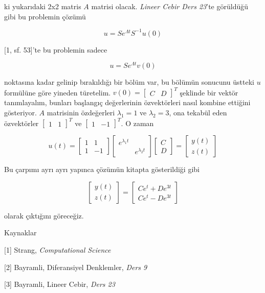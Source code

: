 \documentclass[12pt,fleqn]{article}\usepackage{../../common}
\begin{document}
ki yukarıdaki 2x2 matris $A$ matrisi olacak. {\em Lineer Cebir Ders 23}'te
görüldüğü gibi bu problemin çözümü 

$$ u = S e^{\Lambda t} S^{-1} u(0) $$

[1, sf. 53]'te bu problemin sadece 

$$ u = S e^{\Lambda t} v(0) $$

noktasına kadar gelinip bırakıldığı bir bölüm var, bu bölümün sonucunu üstteki
$u$ formülüne göre yineden türetelim. $v(0) = \left[\begin{array}{cc} C &
    D \end{array}\right]^T$ şeklinde bir vektör tanımlayalım, bunları başlangıç
değerlerinin özvektörleri nasıl kombine ettiğini gösteriyor. $A$ matrisinin
özdeğerleri $\lambda_1=1$ ve $\lambda_2=3$, ona tekabül eden özvektörler
$\left[\begin{array}{cc} 1 & 1 \end{array}\right]^T$ ve $\left[\begin{array}{cc}
    1 & -1 \end{array}\right]^T$. O zaman

$$ 
u(t) =
\left[\begin{array}{rr}
1 & 1 \\
1 & -1
\end{array}\right]
\left[\begin{array}{rr}
e^{\lambda_1 t} & \\
& e^{\lambda_2 t} 
\end{array}\right]
\left[\begin{array}{r}
C \\
D
\end{array}\right]
= 
\left[\begin{array}{r}
y(t) \\
z(t)
\end{array}\right]
 $$

Bu çarpımı ayrı ayrı yapınca çözümün kitapta gösterildiği gibi

$$        
\left[\begin{array}{r}
y(t) \\
z(t)
\end{array}\right]
=
\left[\begin{array}{r}
Ce^t + De^{3t} \\
Ce^t - De^{3t} 
\end{array}\right]
$$

olarak çıktığını göreceğiz. 

Kaynaklar 

[1] Strang, {\em Computational Science}

[2] Bayramli, Diferansiyel Denklemler, {\em Ders 9}

[3] Bayramli, Lineer Cebir, {\em Ders 23}
\end{document}
